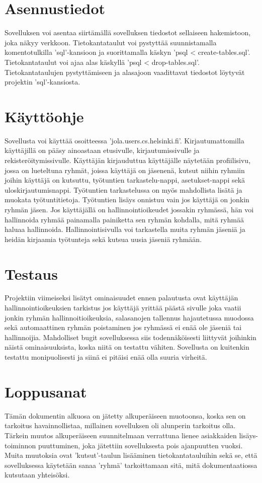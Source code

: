 \documentclass[a4paper, 12pt finnish]{article}
\begin{document}
\section{Asennustiedot} Sovelluksen voi asentaa siirtämällä
sovelluksen tiedostot sellaiseen hakemistoon, joka näkyy
verkkoon. Tietokantataulut voi pystyttää suunnistamalla
komentotulkilla 'sql'-kansioon ja suorittamalla käskyn
'psql < create-tables.sql'. Tietokantataulut voi ajaa
alas käskyllä 'psql < drop-tables.sql'. Tietokantataulujen
pystyttämiseen ja alasajoon vaadittavat tiedostot löytyvät
projektin 'sql'-kansiosta.

\section{Käyttöohje} Sovellusta voi käyttää osoitteessa
'jola.users.cs.helsinki.fi'.
Kirjautumattomilla käyttäjillä on pääsy ainoastaan etusivulle, 
kirjautumissivulle ja rekisteröitymissivulle. Käyttäjän kirjauduttua
käyttäjälle näytetään profiilisivu, jossa on lueteltuna ryhmät, joissa
käyttäjä on jäsenenä, kutsut niihin ryhmiin joihin käyttäjä on kutsuttu,
työtuntien tarkastelu-nappi, asetukset-nappi sekä uloskirjautumisnappi.
Työtuntien tarkastelussa on myös mahdollista lisätä ja muokata
työtuntitietoja. Työtuntien lisäys onnistuu vain jos käyttäjä on jonkin
ryhmän jäsen.
Jos käyttäjällä on hallinnointioikeudet jossakin ryhmässä, hän voi
hallinnoida ryhmää painamalla painiketta sen ryhmän kohdalla, mitä ryhmää
haluaa hallinnoida. Hallinnointisivulla voi tarkastella muita ryhmän
jäseniä ja heidän kirjaamia työtunteja sekä kutsua uusia jäseniä ryhmään.

\section{Testaus} Projektiin viimeiseksi lisätyt ominaisuudet ennen
palautusta ovat käyttäjän hallinnointioikeuksien tarkistus jos käyttäjä
yrittää päästä sivulle joka vaatii jonkin ryhmän hallinnoitioikeuksia,
salasanojen tallennus hajautetussa muodossa sekä automaattinen ryhmän
poistaminen jos ryhmässä ei enää ole jäseniä tai hallinnoijia. Mahdolliset
bugit sovelluksessa siis todennäköisesti liittyvät joihinkin näistä
ominaisuuksista, koska niitä on testattu vähiten. Sovellusta on kuitenkin
testattu monipuolisesti ja siinä ei pitäisi enää olla suuria virheitä.

\section{Loppusanat} Tämän dokumentin alkuosa on jätetty alkuperäiseen
muotoonsa, koska sen on tarkoitus havainnollistaa, millainen sovelluksen
oli alunperin tarkoitus olla. Tärkein muutos alkuperäiseen suunnitelmaan
verrattuna lienee asiakkaiden lisäys-toiminnon puuttuminen, joka jätettiin
sovelluksesta pois ajanpuutten vuoksi. Muita muutoksia ovat 'kutsut'-taulun
lisääminen tietokantatauluihin sekä se, että sovelluksessa käytetään sanaa 
'ryhmä' tarkoittamaan sitä, mitä dokumentaatiossa kutsutaan yhteisöksi.
\end{document}
